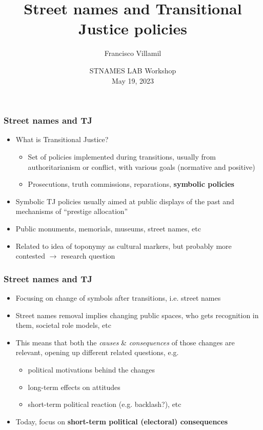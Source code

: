 \documentclass[aspectratio=43]{beamer}
\title{\Large Street names and Transitional Justice policies}
\author{Francisco Villamil}
\date{STNAMES LAB Workshop\\May 19, 2023}
\begin{document}

\begin{frame}
  \titlepage
\end{frame}

\begin{frame}
\frametitle{Street names and TJ}
\centering

\begin{itemize}
  \item<1-> What is Transitional Justice?
  \begin{itemize}
    \item Set of policies implemented during transitions, usually from authoritarianism or conflict, with various goals (normative and positive)
    \item Prosecutions, truth commissions, reparations, \textbf{symbolic policies}
  \end{itemize}
  \item<2-> Symbolic TJ policies usually aimed at public displays of the past and mechanisms of ``prestige allocation''
  \item<2-> Public monuments, memorials, museums, street names, etc
  \item<3-> Related to idea of toponymy as cultural markers, but probably more contested $\rightarrow$ research question
\end{itemize}

\end{frame}

\begin{frame}
\frametitle{Street names and TJ}
\centering

\begin{itemize}[<+->]
  \item Focusing on change of symbols after transitions, i.e. street names
  \item Street names removal implies changing public spaces, who gets recognition in them, societal role models, etc
  \item This means that both the \textit{causes} \& \textit{consequences} of those changes are relevant, opening up different related questions, e.g.
  \begin{itemize}
    \item political motivations behind the changes
    \item long-term effects on attitudes
    \item short-term political reaction (e.g. backlash?), etc
  \end{itemize}
  \item Today, focus on \textbf{short-term political (electoral) consequences}
\end{itemize}

\end{frame}
\end{document}
